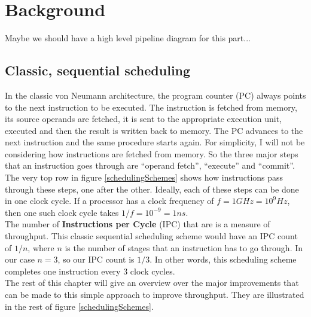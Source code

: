 \documentclass[12pt,a4paper]{article}
\newcommand{\note}{\textcolor{WildStrawberry}}
\begin{document}
\newpage
\section{Background}
\note{Maybe we should have a high level pipeline diagram for this part...}
\subsection{Classic, sequential scheduling}
In the classic von Neumann architecture, the program counter (PC) always points to the next instruction to be executed. The instruction is fetched from memory, its source operands are fetched, it is sent to the appropriate execution unit, executed and then the result is written back to memory. The PC advances to the next instruction and the same procedure starts again. For simplicity, I will not be considering how instructions are fetched from memory. So the three major steps that an instruction goes through are ``operand fetch'', ``execute'' and ``commit''. The very top row in figure \ref{schedulingSchemes} shows how instructions pass through these steps, one after the other. Ideally, each of these steps can be done in one clock cycle. If a processor has a clock frequency of $f=1GHz = 10^{9}Hz$, then one such clock cycle takes $1/f=10^{-9}=1ns$.\\
The number of \textbf{Instructions per Cycle} (IPC) that are  is a measure of throughput. This classic sequential scheduling scheme would have an IPC count of $1/n$, where $n$ is the number of stages that an instruction has to go through. In our case $n=3$, so our IPC count is $1/3$. In other words, this scheduling scheme completes one instruction every 3 clock cycles.\\

The rest of this chapter will give an overview over the major improvements that can be made to this simple approach to improve throughput. They are illustrated in the rest of figure \ref{schedulingSchemes}.
\end{document}
